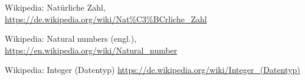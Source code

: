 \documentclass[10pt, a4paper, twocolumn]{article} %
\begin{document}

\begin{thebibliography}{9}
    Wikipedia: Natürliche Zahl,
    \url{https://de.wikipedia.org/wiki/Nat\%C3\%BCrliche_Zahl}

    Wikipedia: Natural numbers (engl.),
    \url{https://en.wikipedia.org/wiki/Natural_number}

    Wikipedia: Integer (Datentyp)
    \url{https://de.wikipedia.org/wiki/Integer_(Datentyp)}
\end{thebibliography}

\clearpage
\appendix
\end{document}
